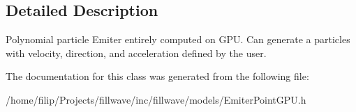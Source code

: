\subsection{Detailed Description}
Polynomial particle Emiter entirely computed on G\+PU. Can generate a particles with velocity, direction, and acceleration defined by the user. 

The documentation for this class was generated from the following file\+:\begin{DoxyCompactItemize}
\item 
/home/filip/\+Projects/fillwave/inc/fillwave/models/Emiter\+Point\+G\+P\+U.\+h\end{DoxyCompactItemize}
